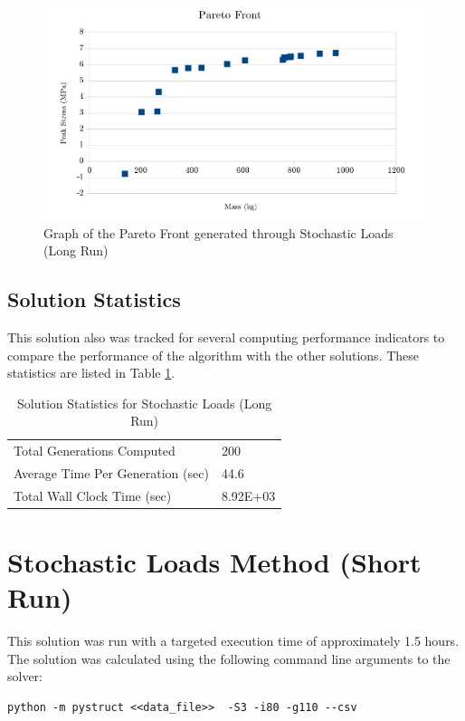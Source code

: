 \begin{figure}
\includegraphics[width=\textwidth]{img/s3i80g200_front.png}
	\caption{Graph of the Pareto Front generated through Stochastic Loads (Long Run)}
\label{fig:pfront_sto}
\end{figure}

\subsection{Solution Statistics}
This solution also was tracked for several computing performance indicators to compare the performance of the algorithm with the other solutions. These statistics are listed in Table \ref{tab:stat_sto}. 

\begin{table}[!htbp]
  \centering
  \begin{tabular}{|l|l|}
    \hline
	  Total Generations Computed & 200\\
    Average Time Per Generation (sec) & 44.6\\
    Total Wall Clock Time (sec)	 & 8.92E+03\\
    \hline
  \end{tabular}
	\caption{Solution Statistics for Stochastic Loads (Long Run)}
  \label{tab:stat_sto}
\end{table}


\section{Stochastic Loads Method (Short Run)}
This solution was run with a targeted execution time of approximately 1.5 hours. The solution was calculated using the following command line arguments to the solver: 

\begin{verbatim}
python -m pystruct <<data_file>>  -S3 -i80 -g110 --csv
\end{verbatim}

